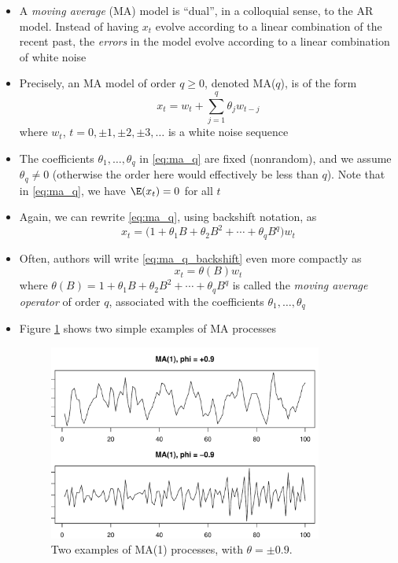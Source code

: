 \documentclass{article}
\begin{document}
\begin{itemize}
\item A \emph{moving average} (MA) model is ``dual'', in a colloquial sense, to
  the AR model. Instead of having $x_t$ evolve according to a linear combination
  of the recent past, the \emph{errors} in the model evolve according to a
  linear combination of white noise

\item Precisely, an MA model of order $q \geq 0$, denoted MA($q$), is of the
  form 
  \begin{equation}
  \label{eq:ma_q}
  x_t = w_t + \sum_{j=1}^q \theta_j w_{t-j} 
  \end{equation}
  where $w_t$, $t = 0, \pm 1, \pm 2, \pm 3, \dots$ is a white noise
  sequence

\item The coefficients $\theta_1,\dots,\theta_q$ in \eqref{eq:ma_q} are fixed
  (nonrandom), and we assume $\theta_q \not= 0$ (otherwise the order here would 
  effectively be less than $q$). Note that in \eqref{eq:ma_q}, we have $\E(x_t)
  = 0$ for all $t$   

\item Again, we can rewrite \eqref{eq:ma_q}, using backshift notation, as 
  \begin{equation}
  \label{eq:ma_q_backshift}
  x_t = \Big(1 + \theta_1 B + \theta_2 B^2 + \cdots + \theta_q B^q \Big) w_t   
  \end{equation}

\item Often, authors will write \eqref{eq:ma_q_backshift} even more compactly as   
  \begin{equation}
  \label{eq:ma_q_operator}
  x_t = \theta(B) w_t 
  \end{equation}
  where $\theta(B) = 1 + \theta_1 B + \theta_2 B^2 + \cdots + \theta_q B^q$ is
  called the \emph{moving average operator} of order $q$, associated with the
  coefficients $\theta_1,\dots,\theta_q$

\item Figure \ref{fig:ma} shows two simple examples of MA processes

\begin{figure}[htb]
\centering
\includegraphics[width=0.85\textwidth]{fig/ma-1.pdf}
\caption{Two examples of MA(1) processes, with $\theta = \pm 0.9$.}
\label{fig:ma}
\end{figure}
\end{itemize}
\end{document}

